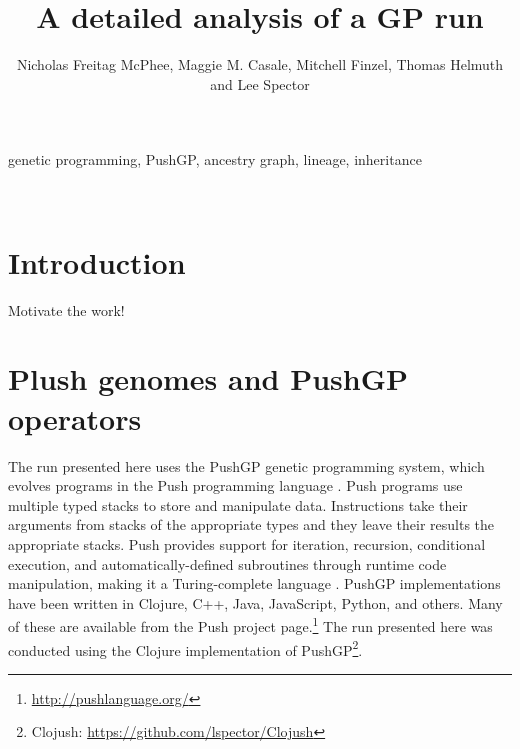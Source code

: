 %

\title*{A detailed analysis of a GP run}
\author{Nicholas Freitag McPhee, Maggie M. Casale, Mitchell Finzel, Thomas Helmuth and Lee Spector}

\maketitle


\begin{keywords}
	genetic programming, PushGP, ancestry graph, lineage, inheritance
\end{keywords}
\\
\section{Introduction}
\label{sec:introduction}

Motivate the work!

\section{Plush genomes and PushGP operators}
\label{sec:background}

The run presented here uses the PushGP genetic programming system, which evolves programs in the Push programming language \citep{spector:2002:GPEM, 1068292}. Push programs use multiple typed stacks to store and manipulate data. Instructions take their arguments from stacks of the appropriate types and they leave their results the appropriate stacks. Push provides support for iteration, recursion, conditional execution, and automatically-defined subroutines through runtime code manipulation, making it a Turing-complete language \citep{1068292}. PushGP implementations have been written in Clojure, C++, Java, JavaScript, Python, and others. Many of these are available from the Push project page.\footnote{\url{http://pushlanguage.org/}} The run presented here was conducted using the Clojure implementation of PushGP\footnote{Clojush: \url{https://github.com/lspector/Clojush}}.

